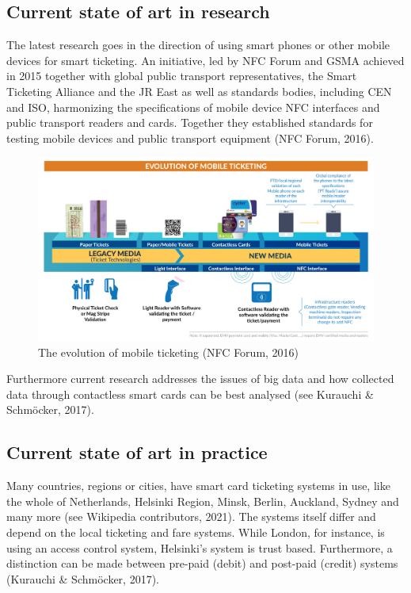 \documentclass[
]{book}
\begin{document}
\hypertarget{current-state-of-art-in-research-4}{%
\subsection*{Current state of art in research}\label{current-state-of-art-in-research-4}}

The latest research goes in the direction of using smart phones or other mobile devices for smart ticketing. An initiative, led by NFC Forum and GSMA achieved in 2015 together with global public transport representatives, the Smart Ticketing Alliance and the JR East as well as standards bodies, including CEN and ISO, harmonizing the specifications of mobile device NFC interfaces and public transport readers and cards. Together they established standards for testing mobile devices and public transport equipment (NFC Forum, 2016).

\begin{figure}
\includegraphics[width=0.9\linewidth]{image/smart_cards} \caption{The evolution of mobile ticketing (NFC Forum, 2016)}\label{fig:unnamed-chunk-6}
\end{figure}

Furthermore current research addresses the issues of big data and how collected data through contactless smart cards can be best analysed (see Kurauchi \& Schmöcker, 2017).

\hypertarget{current-state-of-art-in-practice-4}{%
\subsection*{Current state of art in practice}\label{current-state-of-art-in-practice-4}}

Many countries, regions or cities, have smart card ticketing systems in use, like the whole of Netherlands, Helsinki Region, Minsk, Berlin, Auckland, Sydney and many more (see Wikipedia contributors, 2021). The systems itself differ and depend on the local ticketing and fare systems. While London, for instance, is using an access control system, Helsinki's system is trust based. Furthermore, a distinction can be made between pre-paid (debit) and post-paid (credit) systems (Kurauchi \& Schmöcker, 2017).
\end{document}
